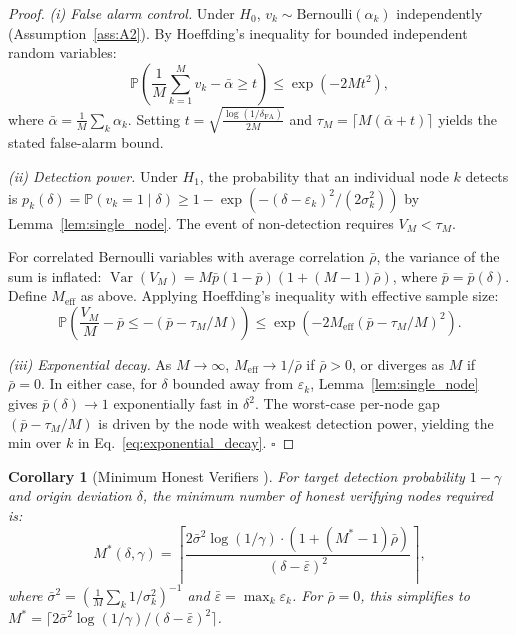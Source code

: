\documentclass[11pt,a4paper]{article}
\newtheorem{corollary}[theorem]{Corollary}
\theoremstyle{definition}
\theoremstyle{remark}
\DeclareMathOperator{\Var}{Var}
\newcommand{\Pbb}{\mathbb{P}}
\begin{document}
\begin{proof}
\textit{(i) False alarm control.} Under $H_0$, $v_k \sim \text{Bernoulli}(\alpha_k)$ independently (Assumption~\ref{ass:A2}). By Hoeffding's inequality for bounded independent random variables:
\begin{equation}
    \Pbb\left(\frac{1}{M}\sum_{k=1}^{M} v_k - \bar{\alpha} \geq t \right) \leq \exp(-2M t^2),
\end{equation}
where $\bar{\alpha} = \frac{1}{M}\sum_k \alpha_k$. Setting $t = \sqrt{\frac{\log(1/\delta_{\text{FA}})}{2M}}$ and $\tau_M = \lceil M(\bar{\alpha} + t) \rceil$ yields the stated false-alarm bound.

\textit{(ii) Detection power.} Under $H_1$, the probability that an individual node $k$ detects is $p_k(\delta) = \Pbb(v_k = 1 \mid \delta) \geq 1 - \exp(-(\delta - \varepsilon_k)^2 / (2\sigma_k^2))$ by Lemma~\ref{lem:single_node}. The event of non-detection requires $V_M < \tau_M$.

For correlated Bernoulli variables with average correlation $\bar{\rho}$, the variance of the sum is inflated: $\Var(V_M) = M\bar{p}(1-\bar{p})(1 + (M-1)\bar{\rho})$, where $\bar{p} = \bar{p}(\delta)$. Define $M_{\mathrm{eff}}$ as above. Applying Hoeffding's inequality with effective sample size:
\begin{equation}
    \Pbb\left(\frac{V_M}{M} - \bar{p} \leq -(\bar{p} - \tau_M/M)\right) \leq \exp\left(-2M_{\mathrm{eff}} (\bar{p} - \tau_M/M)^2\right).
\end{equation}

\textit{(iii) Exponential decay.} As $M \to \infty$, $M_{\mathrm{eff}} \to 1/\bar{\rho}$ if $\bar{\rho} > 0$, or diverges as $M$ if $\bar{\rho} = 0$. In either case, for $\delta$ bounded away from $\varepsilon_k$, Lemma~\ref{lem:single_node} gives $\bar{p}(\delta) \to 1$ exponentially fast in $\delta^2$. The worst-case per-node gap $(\bar{p} - \tau_M/M)$ is driven by the node with weakest detection power, yielding the min over $k$ in Eq.~\eqref{eq:exponential_decay}. \hfill $\square$
\end{proof}

\begin{corollary}[Minimum Honest Verifiers ]
\label{cor:min_verifiers}
For target detection probability $1 - \gamma$ and origin deviation $\delta$, the minimum number of honest verifying nodes required is:
\begin{equation}
    M^*(\delta, \gamma) = \left\lceil \frac{2\bar{\sigma}^2 \log(1/\gamma) \cdot (1 + (M^*-1)\bar{\rho})}{(\delta - \bar{\varepsilon})^2} \right\rceil,
    \label{eq:M_star}
\end{equation}
where $\bar{\sigma}^2 = (\frac{1}{M}\sum_k 1/\sigma_k^2)^{-1}$ and $\bar{\varepsilon} = \max_k \varepsilon_k$. For $\bar{\rho} = 0$, this simplifies to $M^* = \lceil 2\bar{\sigma}^2 \log(1/\gamma) / (\delta - \bar{\varepsilon})^2 \rceil$.
\end{corollary}
\end{document}
